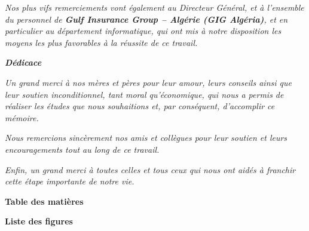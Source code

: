 \documentclass{article}
\begin{document}
\begin{center}
\vspace{1cm}

\fontsize{14pt}{16pt}\selectfont\textit{%
Nos plus vifs remerciements vont également au Directeur Général, et à l’ensemble du personnel de \textbf{Gulf Insurance Group – Algérie (GIG Algéria)}, et en particulier au département informatique, qui ont mis à notre disposition les moyens les plus favorables à la réussite de ce travail.%
}



\end{center}

\newpage
\cleardoublepage
\thispagestyle{empty}

\begin{center}
{\Huge \textbf{\textit{Dédicace}}}

\vspace{2cm}

\fontsize{14pt}{16pt}\selectfont\textit{Un grand merci à nos mères et pères pour leur amour, leurs conseils ainsi que leur soutien inconditionnel, tant moral qu’économique, qui nous a permis de réaliser les études que nous souhaitions et, par conséquent, d’accomplir ce mémoire.}

\vspace{1cm}

\fontsize{14pt}{16pt}\selectfont\textit{Nous remercions sincèrement nos amis et collègues pour leur soutien et leurs encouragements tout au long de ce travail.}

\vspace{1cm}

\fontsize{14pt}{16pt}\selectfont\textit{Enfin, un grand merci à toutes celles et tous ceux qui nous ont aidés à franchir cette étape importante de notre vie. }

\end{center}

\newpage
\begin{center}
{\Huge \textbf{Table des matières}}
\end{center}
\renewcommand{\contentsname}{}
\tableofcontents
\newpage
\begin{center}
{\Huge \textbf{Liste des figures}}
\end{center}
\renewcommand{\listfigurename}{}
\listoffigures
\newpage
{}
\setcounter{page}{1}

\end{document}
